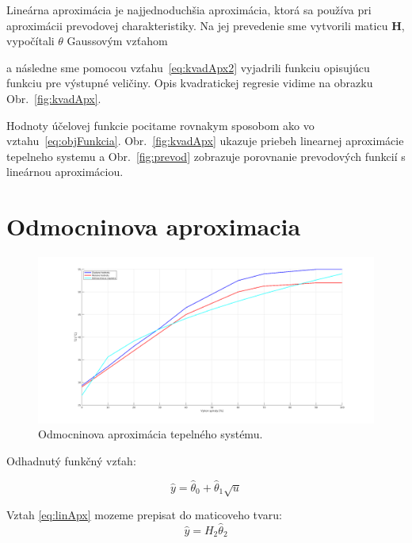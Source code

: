 \documentclass{article}
\begin{document}
Lineárna aproximácia je najjednoduchšia aproximácia, ktorá sa používa pri aproximácii prevodovej
charakteristiky. Na jej prevedenie sme vytvorili maticu \textbf{H}, vypočítali
\(\theta\) Gaussovým vzťahom

a následne sme pomocou vzťahu~\ref{eq:kvadApx2} vyjadrili funkciu opisujúcu funkciu pre výstupné
veličiny. Opis kvadratickej regresie vidime na obrazku Obr.~\ref{fig:kvadApx}.

Hodnoty účelovej funkcie pocitame rovnakym sposobom ako vo vztahu~\ref{eq:objFunkcia}.
Obr.~\ref{fig:kvadApx} ukazuje priebeh linearnej aproximácie tepelneho systemu a
Obr.~\ref{fig:prevod} zobrazuje porovnanie prevodových funkcií s lineárnou aproximáciou.

\clearpage

\section{Odmocninova aproximacia}
\label{sec:odm}

\begin{figure}[!htbp]
	\begin{center}
		\includegraphics[width=\textwidth]{include/odmocninova_regresia.png}
	\end{center}
	\caption{Odmocninova aproximácia tepelného systému.}

	\label{fig:kvadApx}

	\label{fig:odmApx}

\end{figure}

Odhadnutý funkčný vzťah:

\begin{equation}
	\hat{y} = \hat{\theta}_0 + \hat{\theta}_1 \sqrt{u}

	\label{eq:kvadApx}
\end{equation}

Vztah \ref{eq:linApx} mozeme prepisat do maticoveho tvaru:
\begin{equation}
	\hat{y} = H_2\hat{\theta}_2
	\label{eq:kvadApx2}

	\label{eq:odmApx}
\end{equation}
\end{document}

